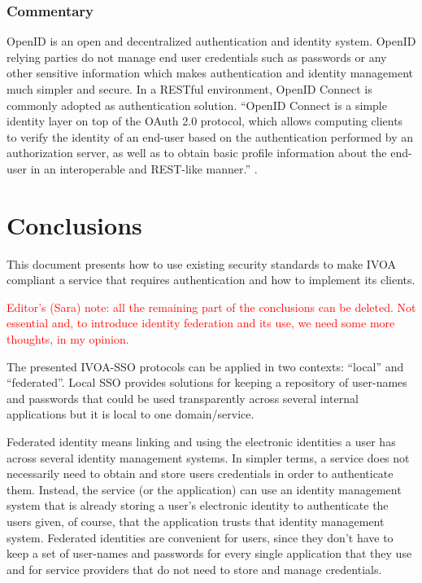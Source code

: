 \documentclass[11pt,a4paper]{ivoa}
\begin{document}
\subsubsection{Commentary}
OpenID is an open and decentralized authentication and identity system.
OpenID relying parties do not manage end user credentials
such as passwords or any other sensitive information which makes
authentication and identity management much simpler and secure.
In a RESTful environment, OpenID Connect \citep{std:openidconnect} is
commonly adopted as authentication solution. ``OpenID Connect  is a
simple identity
layer on top of the OAuth 2.0 protocol, which allows computing clients
to verify the identity of an end-user based on the authentication
 performed by an authorization server, as well as to obtain basic
 profile information about the end-user in an interoperable and
 REST-like manner.'' \citep{std:openid}.

\section{Conclusions}
This document presents how to use existing security standards to make
IVOA compliant a service that requires authentication and how to
implement its clients.

\textcolor{red}{Editor's (Sara) note: all the remaining part of the
conclusions can be deleted. Not essential and, to introduce identity
federation and its use, we need some more thoughts, in my
opinion.}

The presented IVOA-SSO protocols can be applied in two contexts:
``local'' and ``federated''.
Local SSO  provides solutions for keeping a repository of user-names
and passwords that could be used transparently across several internal
applications but it is local to one domain/service.

Federated identity means linking and using the electronic identities a
user has across several identity management systems.
In simpler terms, a service does not necessarily need to obtain and
store users credentials in order to authenticate them. Instead, the
service (or the application) can use an identity management system that
is already storing a user's electronic identity
to authenticate the users given, of course, that the application trusts
that identity management system.
Federated identities are convenient for users, since they don't have to
keep a set of user-names and passwords for every single application that
they use and for service providers that do not need to store and manage
credentials.
\end{document}
